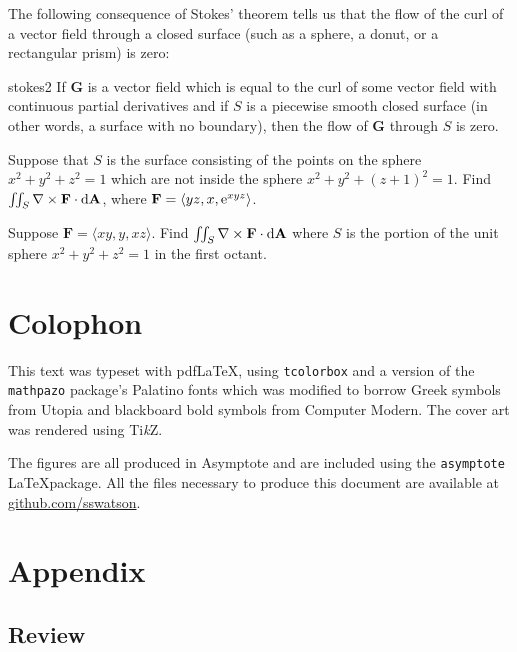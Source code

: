 \documentclass{watsonbook}
\begin{document}
The following consequence of Stokes' theorem tells us that the flow
of the curl of a vector field through a closed surface (such as a
sphere, a donut, or a rectangular prism) is zero:

\begin{obs}{}{stokes2}
  If $\mathbf{G}$ is a vector field which is equal to the curl of
  some vector field with continuous partial derivatives and if $S$
  is a piecewise smooth closed surface (in other words, a surface
  with no boundary), then the flow of $\mathbf{G}$ through $S$ is
  zero.
\end{obs}

\begin{exercise}{}{}
  Suppose that $S$ is the surface consisting of the points on the
  sphere $x^2 + y^2 + z^2 = 1$ which are not inside the sphere
  $x^2 + y^2 + (z+1)^2 = 1$. Find $\iint_{S} \nabla \times \mathbf{F}
  \cdot \mathrm{d}\mathbf{A}$, where $\mathbf{F} = \langle yz, x, \mathrm{e}^{xyz}
  \rangle$. 
\end{exercise}

\begin{exercise}{}{}
  Suppose $\mathbf{F} = \langle xy, y, xz \rangle$. Find
  $\iint_S \nabla \times \mathbf{F} \cdot \mathrm{d}\mathbf{A}$ where $S$ is
  the portion of the unit sphere $x^2 + y^2 + z^2 = 1$ in the first
  octant.
\end{exercise}

\chapter*{Colophon}

This text was typeset with pdf\LaTeX, using \texttt{tcolorbox} and a version of the
\texttt{mathpazo} package's Palatino fonts which was modified to borrow
Greek symbols from Utopia and blackboard bold symbols from Computer
Modern. The cover art was rendered using Ti\textit{k}Z. 

The figures are all produced in Asymptote and are included using the
\texttt{asymptote} \LaTeX package. All the files necessary to produce
this document are available at \url{github.com/sswatson}.

\appendix

\chapter{Appendix}

\section{Review} 
\end{document}
